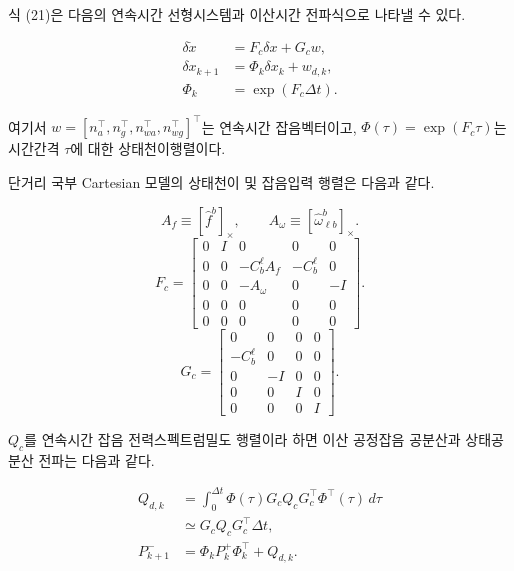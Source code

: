 \documentclass[]{IAC_style}
\begin{document}
식 (21)은 다음의 연속시간 선형시스템과 이산시간 전파식으로 나타낼 수 있다.

\begin{equation}
\tag{22}\label{eq:22}
\begin{aligned}\delta\dot x&=F_c\delta x+G_cw,\\\delta x_{k+1}&=\Phi_k\delta x_k+w_{d,k},\\\Phi_k&=\exp(F_c\Delta t).\end{aligned}
\end{equation}

여기서 $w=[n_a^\top,n_g^\top,n_{wa}^\top,n_{wg}^\top]^\top$는 연속시간 잡음벡터이고, $\Phi(\tau)=\exp(F_c\tau)$는 시간간격 $\tau$에 대한 상태천이행렬이다.

단거리 국부 Cartesian 모델의 상태천이 및 잡음입력 행렬은 다음과 같다.

\begin{equation}
\tag{23a}\label{eq:23a}
A_f\equiv[\hat f^b]_\times,
\qquad
A_\omega\equiv[\hat\omega_{\ell b}^b]_\times.
\end{equation}
\begin{equation}
\tag{23b}\label{eq:23b}
F_c=
\begin{bmatrix}
0&I&0&0&0\\
0&0&-C_b^\ell A_f&-C_b^\ell&0\\
0&0&-A_\omega&0&-I\\
0&0&0&0&0\\
0&0&0&0&0
\end{bmatrix}.
\end{equation}
\begin{equation}
\tag{23c}\label{eq:23c}
G_c=
\begin{bmatrix}
0&0&0&0\\
-C_b^\ell&0&0&0\\
0&-I&0&0\\
0&0&I&0\\
0&0&0&I
\end{bmatrix}.
\end{equation}

$Q_c$를 연속시간 잡음 전력스펙트럼밀도 행렬이라 하면 이산 공정잡음 공분산과 상태공분산 전파는 다음과 같다.

\begin{equation}
\tag{24}\label{eq:24}
\begin{aligned}Q_{d,k}&=\int_0^{\Delta t}\Phi(\tau)G_cQ_cG_c^\top\Phi^\top(\tau)\,d\tau\\&\simeq G_cQ_cG_c^\top\Delta t,\\P_{k+1}^-&=\Phi_kP_k^+\Phi_k^\top+Q_{d,k}.\end{aligned}
\end{equation}
\end{document}
